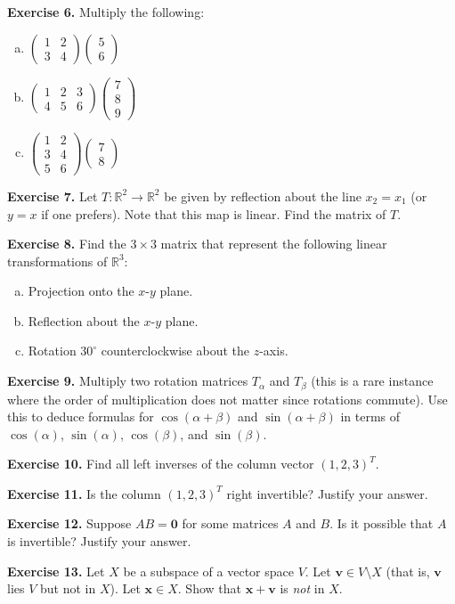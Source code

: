 \documentclass{article}
\begin{document}
\textbf{Exercise 6.} Multiply the following:
\begin{enumerate}[(a)]
    \item $\begin{pmatrix} 1 & 2 \\ 3 & 4 \end{pmatrix} \begin{pmatrix} 5 \\ 6 \end{pmatrix}$
    \item $\begin{pmatrix} 1 & 2 & 3 \\ 4 & 5 & 6 \end{pmatrix} \begin{pmatrix} 7 \\ 8 \\ 9 \end{pmatrix}$           
    \item $\begin{pmatrix} 1 & 2 \\ 3 & 4 \\ 5 & 6 \end{pmatrix} \begin{pmatrix} 7 \\ 8 \end{pmatrix}$
\end{enumerate}

\textbf{Exercise 7.} Let $T : \mathbb{R}^2 \to \mathbb{R}^2$ be given by reflection about the line $x_2 = x_1$ (or $y = x$ if one prefers). Note that this map is linear. Find the matrix of $T$.

\textbf{Exercise 8.} Find the $3 \times 3$ matrix that represent the following linear transformations of $\mathbb{R}^3$:
\begin{enumerate}[(a)]
    \item Projection onto the $x$-$y$ plane.
    \item Reflection about the $x$-$y$ plane.
    \item Rotation $30^\circ$ counterclockwise about the $z$-axis.
\end{enumerate}

\textbf{Exercise 9.} Multiply two rotation matrices $T_{\alpha}$ and $T_{\beta}$ (this is a rare instance where the order of multiplication does not matter since rotations commute). Use this to deduce formulas for
$\cos(\alpha + \beta)$ and $\sin(\alpha + \beta)$ in terms of $\cos(\alpha)$, $\sin(\alpha)$, $\cos(\beta)$, and $\sin(\beta)$.

\textbf{Exercise 10.} Find all left inverses of the column vector $(1,2,3)^T$.

\textbf{Exercise 11.} Is the column $(1,2,3)^T$ right invertible? Justify your answer.

\textbf{Exercise 12.} Suppose $AB = \mathbf{0}$ for some matrices $A$ and $B$. Is it possible that $A$ is invertible? Justify your answer.

\textbf{Exercise 13.} Let $X$ be a subspace of a vector space $V$. Let $\mathbf{v} \in V \setminus X$ (that is, $\mathbf{v}$ lies $V$ but not in $X$). Let $\mathbf{x} \in X$. Show that $\mathbf{x} + \mathbf{v}$ is \emph{not} in $X$.
\end{document}
